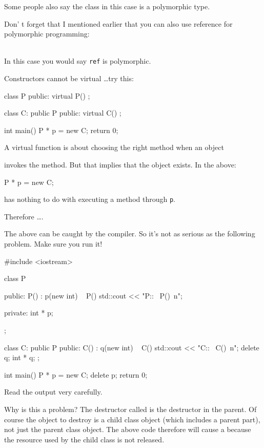 Some people also say the class in this case is a polymorphic type.

Don' t forget that I mentioned earlier that you can also use reference for polymorphic programming:

\\

In this case you would say \verb!ref! is polymorphic.

\newpage{}

Constructors cannot be virtual \ldots try this:

\begin{console}
class P
{
public:
     virtual P() {}
};

class C: public P
{
public:
     virtual C() {}
};

int main()
{   
    P * p = new C;
    return 0;
}
\end{console}

A virtual function is about choosing the right method when an object

invokes the method. But that implies that the object exists. In the above:
\begin{console}
    P * p = new C;
\end{console}

has nothing to do with executing a method through \verb!p!.

Therefore \ldots {}.

The above can be caught by the compiler. So it's not as serious as the following problem. Make sure you run it!

\begin{console}
#include <iostream>

class P
{
public:
     P() : p(new int) {}
     ~ P() { std::cout << "P::~ P()\ n"; }
     
private:
     int * p;
};

class C: public P
{
public:
     C() : q(new int) {}
     ~ C() { std::cout << "C::~ C()\ n"; delete q; }
     int * q;
};

int main()
{   
    P * p = new C;
    delete p;
    return 0;
}
\end{console}

Read the output very carefully.

Why is this a problem? The destructor called is the destructor in the parent. Of course the object to destroy is a child class object (which includes a parent part), not just the parent class object. The above code therefore will cause a  because the resource used by the child class is not released.

